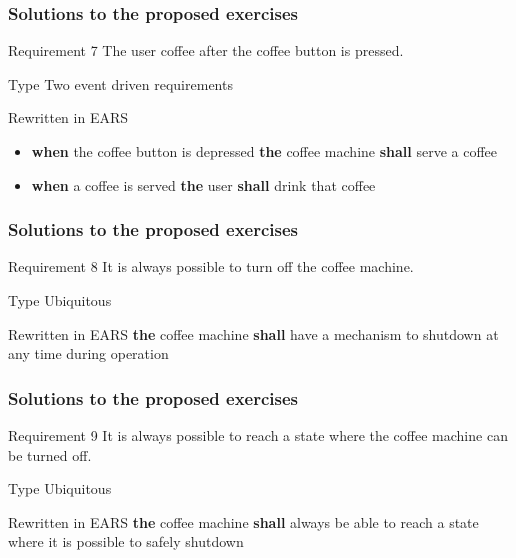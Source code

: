 \documentclass[aspectratio=169]{beamer}
\newcommand{\earsu}[2]{{\bf \color{mypurple}the} {#1} {\bf \color{mypurple}shall} {#2}}
\newcommand{\earse}[3]{{\bf \color{mygreen}when} {#1} {\bf \color{mypurple}the} {#2} {\bf \color{mypurple}shall} {#3}}
\begin{document}
\begin{frame}
  \frametitle{Solutions to the proposed exercises}
  \begin{block}{Requirement 7}
    The user  \alert{coffee} after the \alert{coffee button} is pressed.
  \end{block}
  \begin{block}{Type}
   Two event driven requirements
  \end{block}
  \begin{block}{Rewritten in EARS}
  \begin{itemize}
    \item \earse{the coffee button is depressed}{coffee machine}{serve a coffee}
    \item \earse{a coffee is served}{user}{drink that coffee}
  \end{itemize}
   
  \end{block}
\end{frame}

\begin{frame}
  \frametitle{Solutions to the proposed exercises}
  \begin{block}{Requirement 8}
    It is always possible to \alert{turn off} the coffee machine.
  \end{block}
  \begin{block}{Type}
   Ubiquitous
  \end{block}
  \begin{block}{Rewritten in EARS}
   \earsu{coffee machine}{have a mechanism to shutdown at any time during operation}
  \end{block}
\end{frame}

\begin{frame}
  \frametitle{Solutions to the proposed exercises}
  \begin{block}{Requirement 9}
    It is always possible to reach a state where the coffee machine can be \alert{turned off}.
  \end{block}
  \begin{block}{Type}
   Ubiquitous
  \end{block}
  \begin{block}{Rewritten in EARS}
   \earsu{coffee machine}{always be able to reach a state where it is possible to safely shutdown}
  \end{block}
\end{frame}
\end{document}
